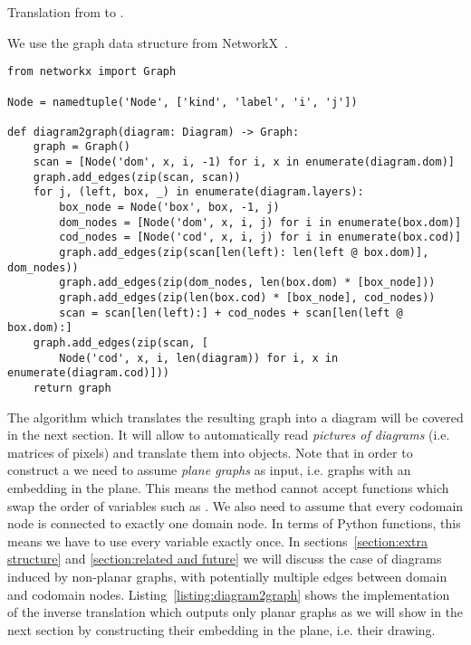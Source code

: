 \begin{python}\label{listing:diagram2graph}
{\normalfont Translation from  to .}

We use the graph data structure from NetworkX~\cite{HagbergEtAl08}.

\begin{verbatim}
from networkx import Graph

Node = namedtuple('Node', ['kind', 'label', 'i', 'j'])

def diagram2graph(diagram: Diagram) -> Graph:
    graph = Graph()
    scan = [Node('dom', x, i, -1) for i, x in enumerate(diagram.dom)]
    graph.add_edges(zip(scan, scan))
    for j, (left, box, _) in enumerate(diagram.layers):
        box_node = Node('box', box, -1, j)
        dom_nodes = [Node('dom', x, i, j) for i in enumerate(box.dom)]
        cod_nodes = [Node('cod', x, i, j) for i in enumerate(box.cod)]
        graph.add_edges(zip(scan[len(left): len(left @ box.dom)], dom_nodes))
        graph.add_edges(zip(dom_nodes, len(box.dom) * [box_node]))
        graph.add_edges(zip(len(box.cod) * [box_node], cod_nodes))
        scan = scan[len(left):] + cod_nodes + scan[len(left @ box.dom):]
    graph.add_edges(zip(scan, [
        Node('cod', x, i, len(diagram)) for i, x in enumerate(diagram.cod)]))
    return graph
\end{verbatim}
\end{python}

The  algorithm which translates the resulting graph into a diagram will be covered in the next section.
It will allow to automatically read \emph{pictures of diagrams} (i.e. matrices of pixels) and translate them into  objects.
Note that in order to construct a  we need to assume \emph{plane graphs} as input, i.e. graphs with an embedding in the plane.
This means the  method cannot accept functions which swap the order of variables such as .
We also need to assume that every codomain node is connected to exactly one domain node.
In terms of Python functions, this means we have to use every variable exactly once.
In sections~\ref{section:extra structure} and \ref{section:related and future} we will discuss the case of diagrams induced by non-planar graphs, with potentially multiple edges between domain and codomain nodes.
Listing~\ref{listing:diagram2graph} shows the implementation of the inverse translation  which outputs only planar graphs as we will show in the next section by constructing their embedding in the plane, i.e. their drawing.
